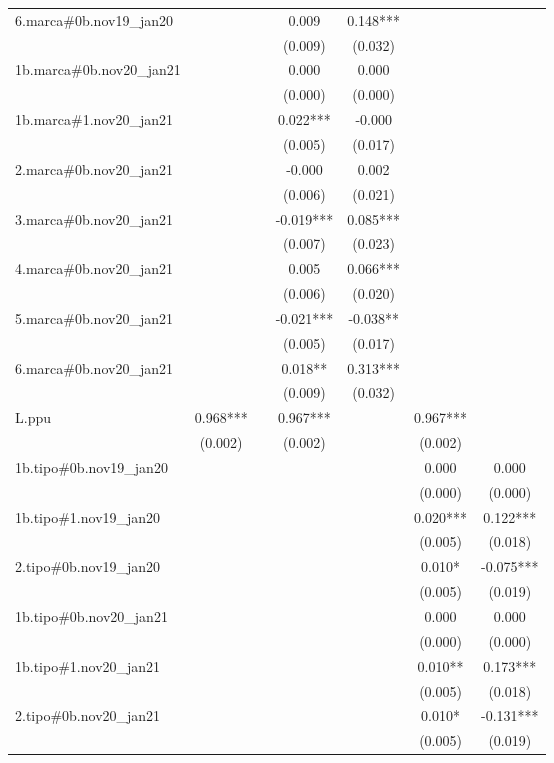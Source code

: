 \begin{tabular}{lcccccc}
6.marca\#0b.nov19\_jan20 &  &  & 0.009 & 0.148*** &  &  \\
 &  &  & (0.009) & (0.032) &  &  \\
1b.marca\#0b.nov20\_jan21 &  &  & 0.000 & 0.000 &  &  \\
 &  &  & (0.000) & (0.000) &  &  \\
1b.marca\#1.nov20\_jan21 &  &  & 0.022*** & -0.000 &  &  \\
 &  &  & (0.005) & (0.017) &  &  \\
2.marca\#0b.nov20\_jan21 &  &  & -0.000 & 0.002 &  &  \\
 &  &  & (0.006) & (0.021) &  &  \\
3.marca\#0b.nov20\_jan21 &  &  & -0.019*** & 0.085*** &  &  \\
 &  &  & (0.007) & (0.023) &  &  \\
4.marca\#0b.nov20\_jan21 &  &  & 0.005 & 0.066*** &  &  \\
 &  &  & (0.006) & (0.020) &  &  \\
5.marca\#0b.nov20\_jan21 &  &  & -0.021*** & -0.038** &  &  \\
 &  &  & (0.005) & (0.017) &  &  \\
6.marca\#0b.nov20\_jan21 &  &  & 0.018** & 0.313*** &  &  \\
 &  &  & (0.009) & (0.032) &  &  \\
L.ppu & 0.968*** &  & 0.967*** &  & 0.967*** &  \\
 & (0.002) &  & (0.002) &  & (0.002) &  \\
1b.tipo\#0b.nov19\_jan20 &  &  &  &  & 0.000 & 0.000 \\
 &  &  &  &  & (0.000) & (0.000) \\
1b.tipo\#1.nov19\_jan20 &  &  &  &  & 0.020*** & 0.122*** \\
 &  &  &  &  & (0.005) & (0.018) \\
2.tipo\#0b.nov19\_jan20 &  &  &  &  & 0.010* & -0.075*** \\
 &  &  &  &  & (0.005) & (0.019) \\
1b.tipo\#0b.nov20\_jan21 &  &  &  &  & 0.000 & 0.000 \\
 &  &  &  &  & (0.000) & (0.000) \\
1b.tipo\#1.nov20\_jan21 &  &  &  &  & 0.010** & 0.173*** \\
 &  &  &  &  & (0.005) & (0.018) \\
2.tipo\#0b.nov20\_jan21 &  &  &  &  & 0.010* & -0.131*** \\
 &  &  &  &  & (0.005) & (0.019) \\

\end{tabular}
